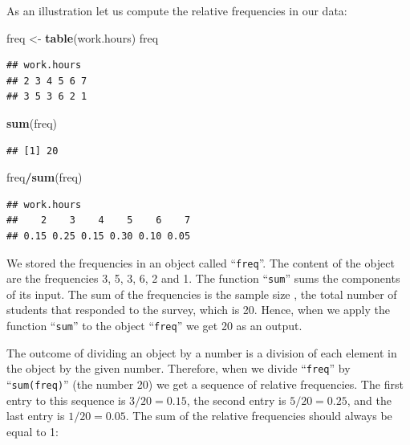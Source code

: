\documentclass[]{krantz}
\makeatletter
\newenvironment{Shaded}{\begin{snugshade}}{\end{snugshade}}
\newcommand{\KeywordTok}[1]{\textcolor[rgb]{0.13,0.29,0.53}{\textbf{#1}}}
\newcommand{\NormalTok}[1]{#1}
\newcommand{\OperatorTok}[1]{\textcolor[rgb]{0.81,0.36,0.00}{\textbf{#1}}}
\newcommand{\StringTok}[1]{\textcolor[rgb]{0.31,0.60,0.02}{#1}}
\newenvironment{kframe}{%
\medskip{}
\setlength{\fboxsep}{.8em}
 \def\at@end@of@kframe{}%
 \ifinner\ifhmode%
  \def\at@end@of@kframe{\end{minipage}}%
  \begin{minipage}{\columnwidth}%
 \fi\fi%
 \def\FrameCommand##1{\hskip\@totalleftmargin \hskip-\fboxsep
 \colorbox{shadecolor}{##1}\hskip-\fboxsep
     \hskip-\linewidth \hskip-\@totalleftmargin \hskip\columnwidth}%
 \MakeFramed {\advance\hsize-\width
   \@totalleftmargin\z@ \linewidth\hsize
   \@setminipage}}%
 {\par\unskip\endMakeFramed%
 \at@end@of@kframe}
\renewenvironment{Shaded}{\begin{kframe}}{\end{kframe}}
\theoremstyle{definition}
\theoremstyle{definition}
\theoremstyle{definition}
\theoremstyle{remark}
\makeatother
\begin{document}
As an illustration let us compute the relative frequencies in our data:

\begin{Shaded}
\begin{Highlighting}[]
\NormalTok{freq <-}\StringTok{ }\KeywordTok{table}\NormalTok{(work.hours)}
\NormalTok{freq}
\end{Highlighting}
\end{Shaded}

\begin{verbatim}
## work.hours
## 2 3 4 5 6 7 
## 3 5 3 6 2 1
\end{verbatim}

\begin{Shaded}
\begin{Highlighting}[]
\KeywordTok{sum}\NormalTok{(freq)}
\end{Highlighting}
\end{Shaded}

\begin{verbatim}
## [1] 20
\end{verbatim}

\begin{Shaded}
\begin{Highlighting}[]
\NormalTok{freq}\OperatorTok{/}\KeywordTok{sum}\NormalTok{(freq)}
\end{Highlighting}
\end{Shaded}

\begin{verbatim}
## work.hours
##    2    3    4    5    6    7 
## 0.15 0.25 0.15 0.30 0.10 0.05
\end{verbatim}

We stored the frequencies in an object called ``\texttt{freq}''. The content of
the object are the frequencies 3, 5, 3, 6, 2 and 1. The function ``\texttt{sum}''
sums the components of its input. The sum of the frequencies is the
sample size , the total number of students that responded to the survey,
which is 20. Hence, when we apply the function ``\texttt{sum}'' to the object
``\texttt{freq}'' we get 20 as an output.

The outcome of dividing an object by a number is a division of each
element in the object by the given number. Therefore, when we divide
``\texttt{freq}'' by ``\texttt{sum(freq)}'' (the number 20) we get a sequence of relative
frequencies. The first entry to this sequence is \(3/20 = 0.15\), the
second entry is \(5/20 = 0.25\), and the last entry is \(1/20 = 0.05\). The
sum of the relative frequencies should always be equal to 1:
\end{document}
